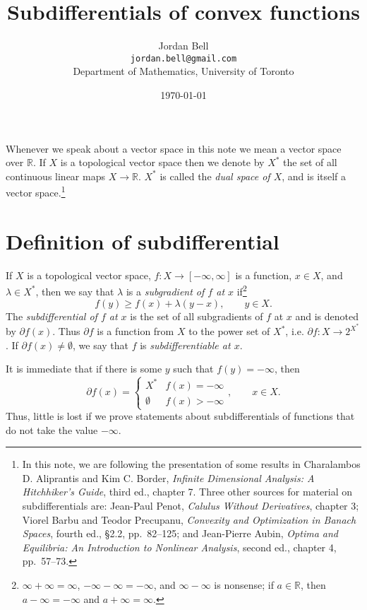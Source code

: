 \documentclass{article}
\theoremstyle{definition}
\begin{document}
\title{Subdifferentials of convex functions}
\author{Jordan Bell\\ \texttt{jordan.bell@gmail.com}\\Department of Mathematics, University of Toronto}
\date{\today}

\maketitle

Whenever we speak about a vector space in this note we mean a vector space over $\mathbb{R}$. If $X$ is a topological vector space then
we denote by $X^*$ the set of all continuous linear maps $X \to \mathbb{R}$.  $X^*$ is called the {\em dual space of $X$}, and is itself a vector space.\footnote{In this note,
we are
following the presentation of some results in Charalambos D. Aliprantis and Kim C. Border, {\em Infinite Dimensional Analysis: A Hitchhiker's Guide}, third ed., chapter 7. Three other sources
for material on subdifferentials are: Jean-Paul Penot, {\em Calulus Without Derivatives}, chapter 3; Viorel Barbu and Teodor Precupanu,  {\em Convexity and Optimization in Banach Spaces}, fourth ed., \S 2.2, pp.~82--125;
and Jean-Pierre Aubin, {\em Optima and Equilibria: An Introduction to Nonlinear Analysis}, second ed., chapter 4, pp.~57--73.}


\section{Definition of subdifferential}
If $X$ is a topological vector space, $f:X \to [-\infty,\infty]$ is a function, $x \in X$, and $\lambda \in X^*$, then we say that $\lambda$ is a
{\em subgradient of $f$ at $x$} if\footnote{$\infty+\infty=\infty$, $-\infty-\infty=-\infty$, and $\infty-\infty$ is nonsense; if $a \in \mathbb{R}$, then $a-\infty=-\infty$ and $a+\infty=\infty$.}
\[
f(y) \geq f(x) + \lambda(y-x), \qquad y \in X.
\]
The {\em subdifferential of $f$ at $x$} is the set of all subgradients of $f$ at $x$ and is denoted by $\partial f(x)$. Thus
$\partial f$ is a function from $X$ to the power set of $X^*$, i.e. $\partial f:X \to 2^{X^*}$. If $\partial f(x) \neq \emptyset$, we say that $f$ is {\em subdifferentiable at $x$}.

It is immediate that if there is some $y$ such that $f(y)=-\infty$, then
\[
\partial f(x) = \begin{cases}
X^*&f(x) = -\infty\\
\emptyset&f(x) > -\infty
\end{cases},\qquad x\in X.
\]
Thus, little is lost if we prove statements about subdifferentials of functions that do not take the value $-\infty$.
\end{document}
